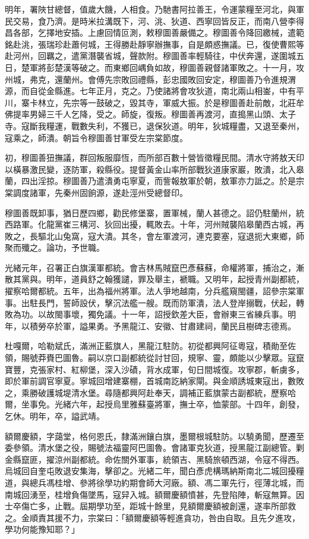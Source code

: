 \begin{pinyinscope}
明年，署陜甘總督，值歲大饑，人相食。乃馳書阿拉善王，令運蒙糧至河北，與軍民交易，食乃濟。是時米拉溝既下，河、洮、狄道、西寧回皆反正，而南八營李得昌各部，乞擇地安插。上慮回情叵測，敕穆圖善嚴備之。穆圖善令降回繳械，遣範銘赴洮，張瑞珍赴蕭何城，王得勝赴靜寧辦撫事，自是頗惑撫議。已，復使曹熙等赴河州，回羈之，遣黨潛襲省城，聲款附。穆圖善率輕騎往，中伏奔還，遂圍城五日，楚軍將彭楚漢等破之。而東鄉回嵎負如故，穆圖善親督諸軍敗之。十一月，攻州城，弗克，還蘭州。會傅先宗敗回禮縣，彭忠國敗回安定，穆圖善乃令進規渭源，而自從金縣進。七年正月，克之。乃使諸將會攻狄道，南北兩山相崟，中有平川，寨卡林立，先宗等一鼓破之，毀其寺，軍威大振。於是穆圖善赴前敵，北莊牟佛提率男婦三千人乞降，受之。師旋，復叛。穆圖善再渡河，直搗黑山頭、太子寺。寇斷我糧運，戰數失利，不獲已，退保狄道。明年，狄城糧盡，又退至秦州，寇乘之，師潰。朝旨令穆圖善甘軍受左宗棠節度。

初，穆圖善狃撫議，群回叛服靡恆，而所部百數十營皆徵糧民間。清水守將敖天印以橫暴激民變，逐防軍，殺縣役。提督黃金山率所部戰狄道康家巖，敗潰，北入皋蘭，四出淫掠。穆圖善乃遣潰勇屯寧夏，而訾報敖軍於朝，敖軍亦力詆之。於是宗棠調度諸軍，先秦州固餉源，遂赴涇州受總督印。

穆圖善既卸事，猶日歷四鄉，勸民修堡寨，置軍械，蘭人甚德之。詔仍駐蘭州，統西路軍。化龍黨崔三構河、狄回出擾，輒敗去。十年，河州賊襲陷皋蘭西古城，再敗之，長驅北山兔窩，寇大潰。其冬，會左軍渡河，連克要塞，寇退扼大東鄉，師聚而殲之。論功，予世職。

光緒元年，召署正白旗漢軍都統。會吉林馬賊竄巴彥蘇蘇，命權將軍，捕治之，漸散其黨與。明年，道員舒之翰獲譴，罪及舉主，褫職。又明年，起授青州副都統，擢察哈爾都統。五年，出為福州將軍。法人爭地越南，分兵艦窺閩疆，詔參宗棠軍事。出駐長門，誓師設伏，擊沉法艦一艘。既而防軍潰，法人登岸搦戰，伏起，轉敗為功。以故閩事壞，獨免議。十一年，詔授欽差大臣，會辦東三省練兵事。明年，以積勞卒於軍，謚果勇。予黑龍江、安徽、甘肅建祠，蘭民且樹碑志德焉。

杜嘎爾，哈勒斌氏，滿洲正藍旗人，黑龍江駐防。初從都興阿征粵寇，積勛至佐領，賜號莽賚巴圖魯。嗣以京口副都統從討甘回，規寧、靈，頗能以少擊眾。寇竄寶豐，克張家村、紅柳堡，深入沙磧，背水成軍，旬日間城復。攻寧郡，斬虜多，即於軍前調官寧夏。寧城回增建寨棚，首城南訖納家閘。與金順誘城東寇出，數敗之，乘勝破護城堤清水堡。尋隨都興阿赴奉天，調補正藍旗蒙古副都統，歷察哈爾，坐事免。光緒六年，起授烏里雅蘇臺將軍，撫士卒，恤蒙部。十四年，創發，乞休。明年，卒，謚武靖。

額爾慶額，字藹堂，格何恩氏，隸滿洲鑲白旗，墨爾根城駐防。以驍勇聞，歷遷至委參領。清水堡之役，賜號法福靈阿巴圖魯。會諸軍克狄道，授黑龍江副總管。剿金縣竄匪，擢涼州副都統。命佐關外軍事，統領吉、黑騎旅頓西湖，令寇不得西。烏城回自奎屯敗退安集海，擊卻之。光緒二年，聞白彥虎構瑪納斯南北二城回擾糧道，與總兵馮桂增、參將徐學功約期會師大河廠。額、馮二軍先行，徑薄北城，而南城回湧至，桂增負傷墜馬，寇舁入城。額爾慶額憤甚，先登陷陣，斬寇無算。因士卒傷亡多，止戰。屆期學功至，距城十餘里，見額爾慶額被創還，遂率所部救之。金順責其援不力，宗棠曰：「額爾慶額等輕進貪功，咎由自取。且先夕進攻，學功何能豫知耶？」


\end{pinyinscope}
